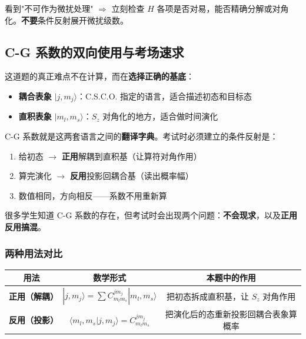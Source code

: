 \begin{warnbox}[考场速判]
看到"不可作为微扰处理" $\Rightarrow$ 立刻检查 $H$ 各项是否对易，能否精确分解或对角化。\textbf{不要}条件反射展开微扰级数。
\end{warnbox}

\subsection{C-G 系数的双向使用与考场速求}

\begin{insightbox}
这道题的真正难点不在计算，而在\textbf{选择正确的基底}：
\begin{itemize}[nosep]
    \item \textbf{耦合表象} $|j,m_j\rangle$：C.S.C.O. 指定的语言，适合描述初态和目标态
    \item \textbf{直积表象} $|m_l,m_s\rangle$：$S_z$ 对角化的地方，适合做时间演化
\end{itemize}

C-G 系数就是这两套语言之间的\textbf{翻译字典}。考试时必须建立的条件反射是：
\begin{enumerate}[nosep]
    \item 给初态 $\to$ \textbf{正用}解耦到直积基（让算符对角作用）
    \item 算完演化 $\to$ \textbf{反用}投影回耦合基（读出概率幅）
    \item 数值相同，方向相反——系数不用重新算
\end{enumerate}
\end{insightbox}

很多学生知道 C-G 系数的存在，但考试时会出现两个问题：\textbf{不会现求}，以及\textbf{正用反用搞混}。

\subsubsection*{两种用法对比}

\begin{center}
\renewcommand{\arraystretch}{1.5}
\begin{tabular}{|c|c|c|}
\hline
\textbf{用法} & \textbf{数学形式} & \textbf{本题中的作用} \\
\hline
\textbf{正用（解耦）} & $|j,m_j\rangle = \sum C_{m_l m_s}^{j m_j}|m_l,m_s\rangle$ & 把初态拆成直积基，让 $S_z$ 对角作用 \\
\hline
\textbf{反用（投影）} & $\langle m_l,m_s|j,m_j\rangle = C_{m_l m_s}^{j m_j}$ & 把演化后的态重新投影回耦合表象算概率 \\
\hline
\end{tabular}
\end{center}

